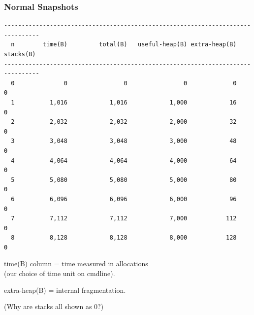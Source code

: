 







\begin{frame}[fragile]
\frametitle{Normal Snapshots}

{\scriptsize
\begin{verbatim}
--------------------------------------------------------------------------------
  n        time(B)         total(B)   useful-heap(B) extra-heap(B)    stacks(B)
--------------------------------------------------------------------------------
  0              0                0                0             0            0
  1          1,016            1,016            1,000            16            0
  2          2,032            2,032            2,000            32            0
  3          3,048            3,048            3,000            48            0
  4          4,064            4,064            4,000            64            0
  5          5,080            5,080            5,000            80            0
  6          6,096            6,096            6,000            96            0
  7          7,112            7,112            7,000           112            0
  8          8,128            8,128            8,000           128            0
\end{verbatim}
}

\large
\begin{changemargin}{2cm}
time(B) column = time measured in allocations\\
(our choice of time unit on cmdline).

extra-heap(B) = internal fragmentation.

(Why are stacks all shown as 0?)
\end{changemargin}

\end{frame}


